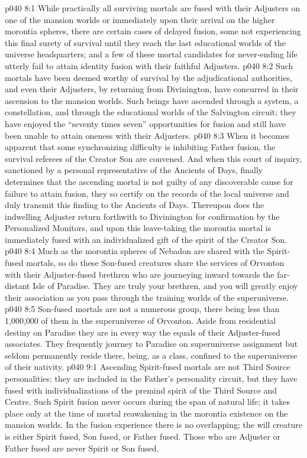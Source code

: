 \vs p040 8:1 While practically all surviving mortals are fused with their Adjusters on one of the mansion worlds or immediately upon their arrival on the higher morontia spheres, there are certain cases of delayed fusion, some not experiencing this final surety of survival until they reach the last educational worlds of the universe headquarters; and a few of these mortal candidates for never\hyp{}ending life utterly fail to attain identity fusion with their faithful Adjusters.
\vs p040 8:2 Such mortals have been deemed worthy of survival by the adjudicational authorities, and even their Adjusters, by returning from Divinington, have concurred in their ascension to the mansion worlds. Such beings have ascended through a system, a constellation, and through the educational worlds of the Salvington circuit; they have enjoyed the “seventy times seven” opportunities for fusion and still have been unable to attain oneness with their Adjusters.
\vs p040 8:3 When it becomes apparent that some synchronizing difficulty is inhibiting Father fusion, the survival referees of the Creator Son are convened. And when this court of inquiry, sanctioned by a personal representative of the Ancients of Days, finally determines that the ascending mortal is not guilty of any discoverable cause for failure to attain fusion, they so certify on the records of the local universe and duly transmit this finding to the Ancients of Days. Thereupon does the indwelling Adjuster return forthwith to Divinington for confirmation by the Personalized Monitors, and upon this leave\hyp{}taking the morontia mortal is immediately fused with an individualized gift of the spirit of the Creator Son.
\vs p040 8:4 \pc Much as the morontia spheres of Nebadon are shared with the Spirit\hyp{}fused mortals, so do these Son\hyp{}fused creatures share the services of Orvonton with their Adjuster\hyp{}fused brethren who are journeying inward towards the far\hyp{}distant Isle of Paradise. They are truly your brethren, and you will greatly enjoy their association as you pass through the training worlds of the superuniverse.
\vs p040 8:5 Son\hyp{}fused mortals are not a numerous group, there being less than 1,000,000 of them in the superuniverse of Orvonton. Aside from residential destiny on Paradise they are in every way the equals of their Adjuster\hyp{}fused associates. They frequently journey to Paradise on superuniverse assignment but seldom permanently reside there, being, as a class, confined to the superuniverse of their nativity.
\vs p040 9:1 Ascending Spirit\hyp{}fused mortals are not Third Source personalities; they are included in the Father’s personality circuit, but they have fused with individualizations of the premind spirit of the Third Source and Centre. Such Spirit fusion never occurs during the span of natural life; it takes place only at the time of mortal reawakening in the morontia existence on the mansion worlds. In the fusion experience there is no overlapping; the will creature is either Spirit fused, Son fused, or Father fused. Those who are Adjuster or Father fused are never Spirit or Son fused.
